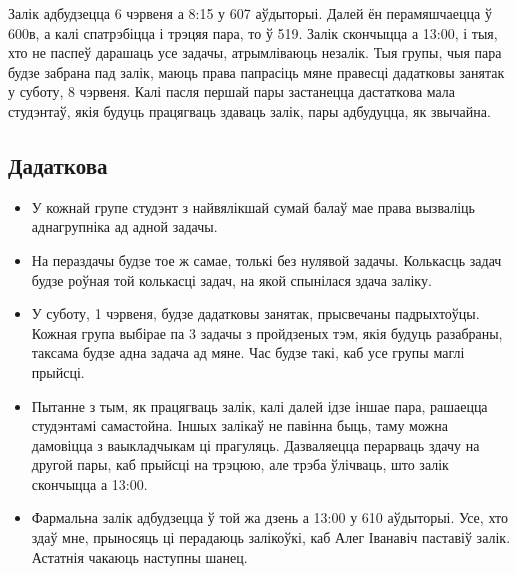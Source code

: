     Залік адбудзецца 6 чэрвеня а 8:15 у 607 аўдыторыі. Далей ён перамяшчаецца ў 600в, а калі спатрэбіцца і трэцяя пара, то ў 519. Залік скончыцца а 13:00, і тыя, хто не паспеў дарашаць усе задачы, атрымліваюць незалік. Тыя групы, чыя пара будзе забрана пад залік, маюць права папрасіць мяне правесці дадатковы занятак у суботу, 8 чэрвеня. Калі пасля першай пары застанецца дастаткова мала студэнтаў, якія будуць працягваць здаваць залік, пары адбудуцца, як звычайна.

    \subsection{Дадаткова}
    
    \begin{itemize}
        \item У кожнай групе студэнт з найвялікшай сумай балаў мае права вызваліць аднагрупніка ад адной задачы.
        \item На пераздачы будзе тое ж самае, толькі без нулявой задачы. Колькасць задач будзе роўная той колькасці задач, на якой спынілася здача заліку.
        \item У суботу, 1 чэрвеня, будзе дадатковы занятак, прысвечаны падрыхтоўцы. Кожная група выбірае па 3 задачы з пройдзеных тэм, якія будуць разабраны, таксама будзе адна задача ад мяне. Час будзе такі, каб усе групы маглі прыйсці.
        \item Пытанне з тым, як працягваць залік, калі далей ідзе іншае пара, рашаецца студэнтамі самастойна. Іншых залікаў не павінна быць, таму можна дамовіцца з ваыкладчыкам ці прагуляць. Дазваляецца перарваць здачу на другой пары, каб прыйсці на трэцюю, але трэба ўлічваць, што залік скончыцца а 13:00.
        \item Фармальна залік адбудзецца ў той жа дзень а 13:00 у 610 аўдыторыі. Усе, хто здаў мне, прыносяць ці перадаюць залікоўкі, каб Алег Іванавіч паставіў залік. Астатнія чакаюць наступны шанец.
    \end{itemize}
